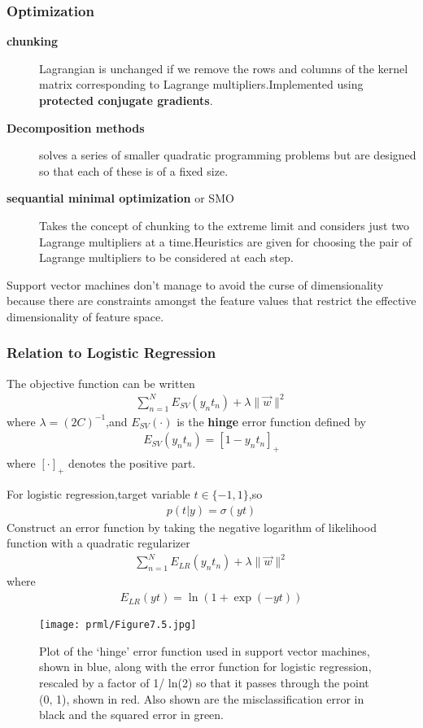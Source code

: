 \subsubsection{Optimization}
\begin{description}
	\item[\textbf{chunking}]Lagrangian is unchanged if we remove the rows and columns of the kernel matrix corresponding to Lagrange multipliers.Implemented using \textbf{protected conjugate gradients}.
	\item[\textbf{Decomposition methods}] solves a series of smaller quadratic programming problems but are designed so that each of these is of a fixed size.
	\item[\textbf{sequantial minimal optimization} or SMO] Takes the concept of chunking to the extreme limit and considers just two Lagrange multipliers at a time.Heuristics are given for choosing the pair of Lagrange multipliers to be considered at each step.
\end{description}

Support vector machines don't manage to avoid the curse of dimensionality because there are constraints amongst the feature values that restrict the effective dimensionality of feature space.

\subsubsection{Relation to Logistic Regression}
The objective function can be written 
\begin{align}
\sum_{n=1}^{N}E_{SV}(y_n t_n) +\lambda\parallel\vec{w}\parallel^2
\end{align}
where $\lambda=(2C)^{-1}$,and $E_{SV}(\cdot)$ is the \textbf{hinge} error function defined by
\begin{align}
E_{SV}(y_n t_n)= [1-y_n t_n]_{+}
\end{align}
where $[\cdot]_+$ denotes the positive part.

For logistic regression,target variable $t\in \{-1,1\}$,so
\begin{align}
p(t|y)=\sigma(yt)
\end{align}
Construct an error function by taking the negative logarithm of likelihood function with a quadratic regularizer
\begin{align}
\sum_{n=1}^{N}E_{LR}(y_n t_n)+\lambda\parallel\vec{w}\parallel^2
\end{align}
where
\begin{align}
E_{LR}(yt)=\ln(1+\exp(-yt))
\end{align}
\begin{SCfigure*}
	\caption{Plot of the ‘hinge’ error function used in support vector machines, shown in blue, along with the error function for logistic regression, rescaled by a factor of 1/ ln(2) so that it passes through the point (0, 1), shown in red. Also shown are the misclassification error in black and the squared error in green.}
	\texttt{[image: prml/Figure7.5.jpg]}
\end{SCfigure*}

